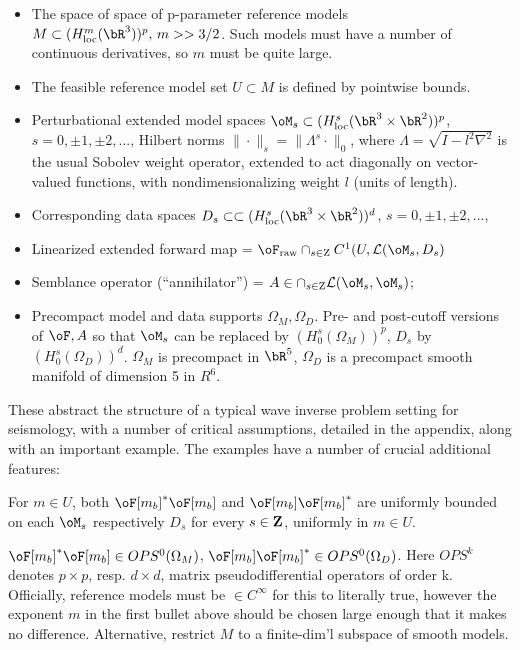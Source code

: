 \begin{itemize}
\item The space of space of p-parameter reference models $M \subset
  (H_{\rm loc}^m(\bR^3))^p,\,m>>3/2$. Such models must have a number of continuous
  derivatives, so $m$ must be quite large.
\item The feasible reference model set $U \subset M$ is defined by
  pointwise bounds.
\item Perturbational extended model spaces $\oM_s \subset (H^s_{\rm
    loc}(\bR^3 \times \bR^2))^p$, $s=0, \pm 1, \pm 2,...$, Hilbert norms $\|\cdot\|_{s} = \|\Lambda^s \cdot\|_0$, where $\Lambda = \sqrt{I-l^2\nabla^2}$ is the usual Sobolev weight operator, extended to act diagonally on vector-valued functions, with nondimensionalizing weight $l$ (units of length). 
\item Corresponding data spaces $D_s \subset \subset (H^s_{\rm
    loc}(\bR^3 \times \bR^2))^d$, $s=0, \pm 1, \pm 2,...$, 
\item Linearized extended forward map = $\oF_{\rm raw} \cap_{s \in
    {\rm Z}} C^1(U , {\cal L}(\oM_s,D_s)$ 
\item Semblance operator (``annihilator'') = $A \in \cap_{s \in
    {\rm Z}} {\cal L}(\oM_s,\oM_s)$;
\item Precompact model and data supports $\Omega_M, \Omega_D$. Pre-
  and post-cutoff versions of $\oF, A$ so that $\oM_s$ can be
  replaced by $(H^s_0(\Omega_M))^p$, $D_s$ by
  $(H^s_0(\Omega_D))^d$. $\Omega_M$ is precompact in $\bR^5$,
  $\Omega_D$ is a precompact smooth manifold of dimension 5 in $R^6$.
\end{itemize}

These abstract the structure of a typical wave inverse problem setting for seismology, with a number of critical assumptions, detailed in the appendix, along with an important example. The examples have a number of crucial additional features:

 For $m \in U$, both $\oF[m_b]^*\oF[m_b]$ and $\oF[m_b]\oF[m_b]^*$ are uniformly bounded on each $\oM_s$ respectively $D_s$ for every $s \in {\bf Z}$, uniformly in $m \in U$.

 $\oF[m_b]^*\oF[m_b] \in OPS^0(\Omega_M)$,
$\oF[m_b]\oF[m_b]^* \in OPS^0(\Omega_D)$. Here $OPS^k$ denotes $p \times
p$, resp. $d \times d$, matrix pseudodifferential operators of order
k. Officially, reference models must be $\in C^{\infty}$ for this to
literally true, however the exponent $m$ in the first bullet above
should be chosen large enough that it makes no
difference. Alternative, restrict $M$ to a finite-dim'l subspace of
smooth models.

